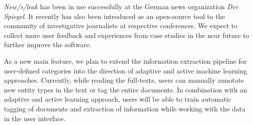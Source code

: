 \documentclass[11pt,a4paper]{article}
\begin{document}
\emph{New/s/leak} has been in use successfully at the German news organization \textit{Der Spiegel}. It recently has also been introduced as an open-source tool to the community of investigative journalists at respective conferences. We expect to collect more user feedback and experiences from case studies in the near future to further improve the software.

As a new main feature, we plan to extend the information extraction pipeline for user-defined categories into the direction of adaptive and active machine learning approaches. Currently, while reading the full-texts, users can manually annotate new entity types in the text or tag the entire documents. In combination with an adaptive and active learning approach, users will be able to train automatic tagging of documents and extraction of information while working with the data in the user interface.



\end{document}
